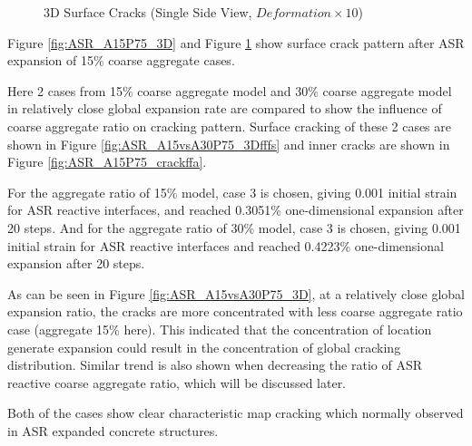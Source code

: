 \begin{figure}[!h]
  \caption{3D Surface Cracks (Single Side View, $Deformation \times 10$)}
  \label{fig:ASR_A15P75_3DS}
\end{figure}

Figure \ref{fig:ASR_A15P75_3D} and Figure \ref{fig:ASR_A15P75_3DS} show surface crack pattern after ASR expansion of 15\% coarse aggregate cases.

Here 2 cases from 15\% coarse aggregate model and 30\% coarse aggregate model in relatively close global expansion rate are compared to show the influence of coarse aggregate ratio on cracking pattern. Surface cracking of these 2 cases are shown in Figure \ref{fig:ASR_A15vsA30P75_3Dfffs} and inner cracks are shown in Figure \ref{fig:ASR_A15P75_crackffa}.

For the aggregate ratio of 15\% model, case 3 is chosen, giving 0.001 initial strain for ASR reactive interfaces, and reached 0.3051\% one-dimensional expansion after 20 steps. And for the aggregate ratio of 30\% model, case 3 is chosen, giving 0.001 initial strain for ASR reactive interfaces and reached 0.4223\% one-dimensional expansion after 20 steps.


As can be seen in Figure \ref{fig:ASR_A15vsA30P75_3D}, at a relatively close global expansion ratio, the cracks are more concentrated with less coarse aggregate ratio case (aggregate 15\% here). This indicated that the concentration of location generate expansion could result in the concentration of global cracking distribution. Similar trend is also shown when decreasing the ratio of ASR reactive coarse aggregate ratio, which will be discussed later.

Both of the cases show clear characteristic map cracking which normally observed in ASR expanded concrete structures.

